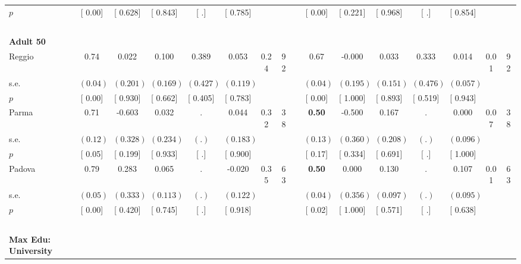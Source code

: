 \begin{longtable}{L{8em} c c c c c c c p{1em} c c c c c c c}
\quad \quad \quad \quad $ p$ & [     0.00] & [    0.628] & [    0.843] & [        .] & [    0.785] & & & & [     0.00] & [    0.221] & [    0.968] & [        .] & [    0.854] & &  \\[1em]
~\\[1em]
\quad \quad \textbf{Adult 50} & & & & & & & & & & & & & & & \\* 
\quad \quad \quad Reggio& 0.74 &     0.022 &     0.100 &     0.389 &     0.053 &      0.24 &        92 & & 0.67 &    -0.000 &     0.033 &     0.333 &     0.014 &      0.01 &        92  \\*
\quad \quad \quad \quad s.e.& $ (     0.04)$ & $ (    0.201)$ & $ (    0.169)$ & $ (    0.427)$ & $ (    0.119)$ & & & & $ (     0.04)$ & $ (    0.195)$ & $ (    0.151)$ & $ (    0.476)$ & $ (    0.057)$ & &  \\*
\quad \quad \quad \quad $ p$ & [     0.00] & [    0.930] & [    0.662] & [    0.405] & [    0.783] & & & & [     0.00] & [    1.000] & [    0.893] & [    0.519] & [    0.943] & &  \\[1em]
\quad \quad \quad Parma& 0.71 &    -0.603 &     0.032 &         . &     0.044 &      0.32 &        38 & & \textbf{     0.50} &    -0.500 &     0.167 &         . &     0.000 &      0.07 &        38  \\*
\quad \quad \quad \quad s.e.& $ (     0.12)$ & $ (    0.328)$ & $ (    0.234)$ & $ (        .)$ & $ (    0.183)$ & & & & $ (     0.13)$ & $ (    0.360)$ & $ (    0.208)$ & $ (        .)$ & $ (    0.096)$ & &  \\*
\quad \quad \quad \quad $ p$ & [     0.05] & [    0.199] & [    0.933] & [        .] & [    0.900] & & & & [     0.17] & [    0.334] & [    0.691] & [        .] & [    1.000] & &  \\[1em]
\quad \quad \quad Padova& 0.79 &     0.283 &     0.065 &         . &    -0.020 &      0.35 &        63 & & \textbf{     0.50} &     0.000 &     0.130 &         . &     0.107 &      0.01 &        63  \\*
\quad \quad \quad \quad s.e.& $ (     0.05)$ & $ (    0.333)$ & $ (    0.113)$ & $ (        .)$ & $ (    0.122)$ & & & & $ (     0.04)$ & $ (    0.356)$ & $ (    0.097)$ & $ (        .)$ & $ (    0.095)$ & &  \\*
\quad \quad \quad \quad $ p$ & [     0.00] & [    0.420] & [    0.745] & [        .] & [    0.918] & & & & [     0.02] & [    1.000] & [    0.571] & [        .] & [    0.638] & &  \\[1em]
~\\[1em]
\textbf{Max Edu: University} \\*

\end{longtable}
